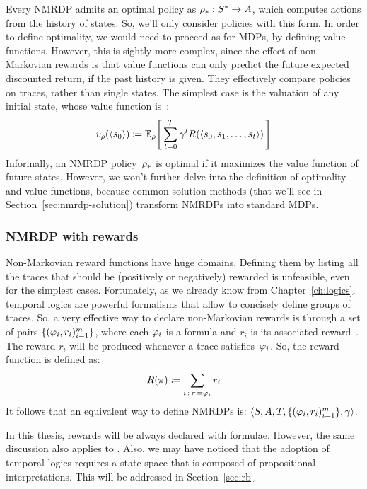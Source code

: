 Every NMRDP admits an optimal policy as ${{\rho}_*: S^* \to A}$, which
computes actions from the history of states. So, we'll only consider policies
with this form. In order to define optimality, we would need to proceed as for
MDPs, by defining value functions. However, this is sightly more complex,
since the effect of non-Markovian rewards is that value functions can only
predict the future expected discounted return, if the past history is given.
They effectively compare policies on traces, rather than single states.  The
simplest case is the valuation of any initial state, whose value function
is~\cite{bib:nmrdp-logic-first}:
\begin{equation}
	v_{\rho}(\langle s_0 \rangle) \coloneqq \mathbb{E}_{\rho} \Biggl[\,
		\sum_{t=0}^{T} \gamma^t R(\langle s_0, s_1, \dots, s_t \rangle)
		\,\Biggr]
\end{equation}
Informally, an NMRDP policy~${\rho}_*$ is optimal if it maximizes the
value function of future states. However, we won't further delve into the
definition of optimality and value functions, because common solution methods
(that we'll see in Section~\ref{sec:nmrdp-solution}) transform NMRDPs into
standard MDPs.


\subsubsection[NMRDP with LDLf rewards]{NMRDP with \ldl{} rewards}

Non-Markovian reward functions have huge domains. Defining them by listing all
the traces that should be (positively or negatively) rewarded is unfeasible,
even for the simplest cases. Fortunately, as we already know from
Chapter~\ref{ch:logics}, temporal logics are powerful formalisms that allow to
concisely define groups of traces. So, a very effective way to declare
non-Markovian rewards is through a set of pairs $\{(\varphi_i,
r_i)_{i=1}^m\}$, where each $\varphi_i$ is a \ldl{} formula and $r_i$ is its
associated reward~\cite{bib:degiacomo-logic-nmrdp}. The reward $r_i$ will be
produced whenever a trace satisfies~$\varphi_i$. So, the reward function is
defined as:
\begin{equation}
	R(\pi) \coloneqq \sum_{i \,:\, \pi \models \varphi_i} r_i
\end{equation}
It follows that an equivalent way to define NMRDPs is: $\langle S, A, T,
\{(\varphi_i, r_i)_{i=1}^m\}, \gamma \rangle$.

In this thesis, rewards will be always declared with \ldl{} formulae. However,
the same discussion also applies to \ltl{}. Also, we may have noticed that the
adoption of temporal logics requires a state space that is composed of
propositional interpretations. This will be addressed in Section~\ref{sec:rb}.


